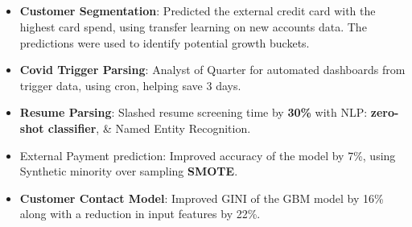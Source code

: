 \documentclass[a4,10pt]{article}
\newenvironment{zitemize}{
\begin{itemize}\itemsep0pt \parskip0pt \parsep1pt}
{\end{itemize}\vspace{-0.4cm}}
\begin{document}
\subsection*{{\normalsize{}}}
\vspace{0.05cm}
    \begin{zitemize}
        \item \textbf{Customer Segmentation}: Predicted the external credit card with the highest card spend, using transfer learning on new accounts data. The predictions were used to identify potential growth buckets.
        \item \textbf{Covid Trigger Parsing}: Analyst of Quarter for automated dashboards from trigger data, using cron, helping save 3 days.
        \item \textbf{Resume Parsing}: Slashed resume screening time by \textbf{30\%} with NLP: \textbf{zero-shot classifier}, \& Named Entity Recognition.
        \item External Payment prediction: Improved accuracy of the model by 7\%, using Synthetic minority over sampling \textbf{SMOTE}.
        \item \textbf{Customer Contact Model}: Improved GINI of the GBM model by 16\% along with a reduction in input features by 22\%.
    \end{zitemize}

\end{document}
